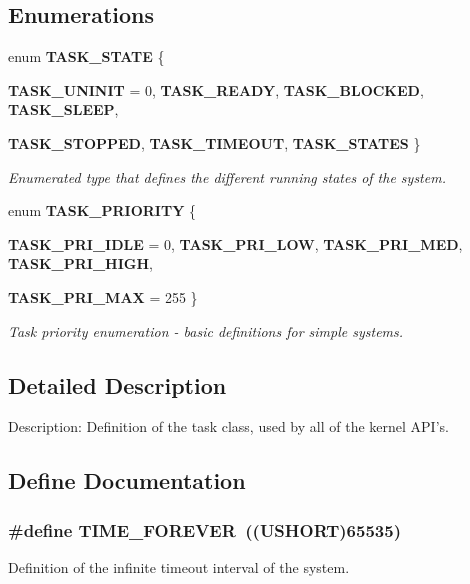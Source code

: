 \subsection*{Enumerations}
\begin{DoxyCompactItemize}
\item 
enum {\bf TASK\_\-STATE} \{ \par
{\bf TASK\_\-UNINIT} =  0, 
{\bf TASK\_\-READY}, 
{\bf TASK\_\-BLOCKED}, 
{\bf TASK\_\-SLEEP}, 
\par
{\bf TASK\_\-STOPPED}, 
{\bf TASK\_\-TIMEOUT}, 
{\bf TASK\_\-STATES}
 \}
\begin{DoxyCompactList}\small\item\em Enumerated type that defines the different running states of the system. \item\end{DoxyCompactList}\item 
enum {\bf TASK\_\-PRIORITY} \{ \par
{\bf TASK\_\-PRI\_\-IDLE} =  0, 
{\bf TASK\_\-PRI\_\-LOW}, 
{\bf TASK\_\-PRI\_\-MED}, 
{\bf TASK\_\-PRI\_\-HIGH}, 
\par
{\bf TASK\_\-PRI\_\-MAX} =  255
 \}
\begin{DoxyCompactList}\small\item\em Task priority enumeration -\/ basic definitions for simple systems. \item\end{DoxyCompactList}\end{DoxyCompactItemize}


\subsection{Detailed Description}
Description: Definition of the task class, used by all of the kernel API's. 

\subsection{Define Documentation}
\subsubsection[{TIME\_\-FOREVER}]{\setlength{\rightskip}{0pt plus 5cm}\#define TIME\_\-FOREVER~((USHORT)65535)}\label{task_8h_aebc656c5b2f0a3a9ee1178896692ce9a}


Definition of the infinite timeout interval of the system. 

